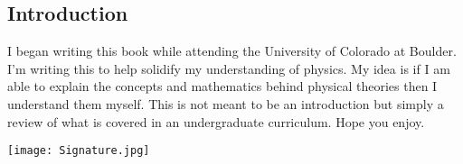 \subsection*{Introduction}
	\indent
	I began writing this book while attending the University of Colorado at Boulder.
	I'm writing this to help solidify my understanding of physics.
	My idea is if I am able to explain the concepts and mathematics behind physical theories then I understand them myself.
	This is not meant to be an introduction but simply a review of what is covered in an undergraduate curriculum.
	Hope you enjoy.\\
	\begin{flushright}
    \texttt{[image: Signature.jpg]}
	\end{flushright}
